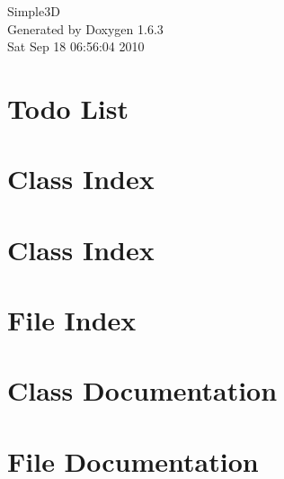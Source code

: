 \documentclass[a4paper]{book}
\begin{document}
\hypersetup{pageanchor=false}
\begin{titlepage}
\vspace*{7cm}
\begin{center}
{\Large Simple3D }\\
\vspace*{1cm}
{\large Generated by Doxygen 1.6.3}\\
\vspace*{0.5cm}
{\small Sat Sep 18 06:56:04 2010}\\
\end{center}
\end{titlepage}
\clearemptydoublepage
{}
\tableofcontents
\clearemptydoublepage
{}
\hypersetup{pageanchor=true}
\chapter{Todo List}
\label{todo}
\hypertarget{todo}{}

\chapter{Class Index}

\chapter{Class Index}

\chapter{File Index}

\chapter{Class Documentation}












\chapter{File Documentation}














\printindex
\end{document}
